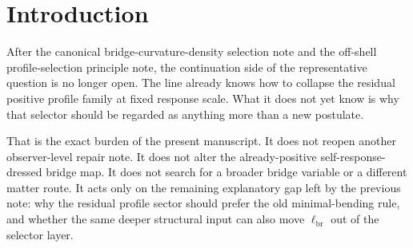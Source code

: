 \documentclass[11pt]{article}
\newcommand{\CurvScale}{\ell_{\mathrm{br}}}
\newcommand{\CurvProfile}{F_{\mathrm{br}}}
\newcommand{\ProfWeight}{\varpi_{\mathrm{br}}}
\newcommand{\RespSus}{\Sigma_{\mathrm{br}}}
\newcommand{\RespSusEq}{\Sigma_{\mathrm{br}}^{\ast}}
\newcommand{\RespEnergyPin}{\mathscr E_{\mathrm{br}}^{\mathrm{pin}}}
\newcommand{\RespStiff}{\kappa_{\mathrm{br}}}
\newcommand{\RespPin}{\mu_{\mathrm{br}}}
\begin{document}
\begin{abstract}
The note then adds the smallest equilibrium pinning compatible with the same downstream package,
\[
\RespEnergyPin[\RespSus]
\equiv
\frac{\RespStiff}{2}\int_{\mathbb R}\ProfWeight\abs{\RespSus'}^2\,dx
+
\frac{\RespPin}{2}\int_{\mathbb R}\ProfWeight\abs{\RespSus-\RespSusEq}^2\,dx,
\]
with \(\RespSusEq>0\). Its unique minimizer is the constant susceptibility \(\RespSus\equiv\RespSusEq\), so the unique compatible bridge-curvature profile is
\[
\CurvProfile(x)=1+\RespSusEq x^2,
\qquad
\CurvScale^4=\RespSusEq.
\]
Therefore the same deeper susceptibility sector both justifies the old selector and, on the stronger pinned branch, fixes the response scale as equilibrium substrate data rather than leaving it as selector data. The claim boundary is strict: this note does not claim that the old explicit local density already implied this deeper sector without new input, and it does not claim a completed ultraviolet derivation. Its narrower result is that the off-shell selector and its scale now arise from a disciplined deeper substrate homogeneity-plus-equilibrium principle while the bridge map and downstream package stay fixed.
\end{abstract}

\section{Introduction}

After the canonical bridge-curvature-density selection note and the off-shell profile-selection principle note, the continuation side of the representative question is no longer open. The line already knows how to collapse the residual positive profile family at fixed response scale. What it does not yet know is why that selector should be regarded as anything more than a new postulate.

That is the exact burden of the present manuscript. It does not reopen another observer-level repair note. It does not alter the already-positive self-response-dressed bridge map. It does not search for a broader bridge variable or a different matter route. It acts only on the remaining explanatory gap left by the previous note: why the residual profile sector should prefer the old minimal-bending rule, and whether the same deeper structural input can also move \(\CurvScale\) out of the selector layer.
\end{document}
